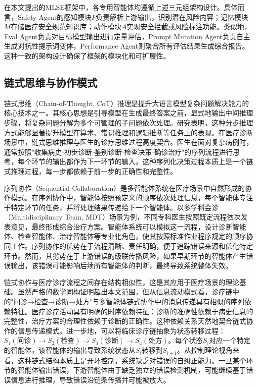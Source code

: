 在本文提出的MLSE框架中，各专用智能体均遵循上述三元组架构设计。具体而言，Safety Agent的感知模块$P$负责解析上游输出，识别潜在风险内容；记忆模块$M$存储医疗安全规范知识库；动作模块$A$实现安全拦截或风险标注功能。类似地，Eval Agent负责对目标模型输出进行定量评估，Prompt Mutation Agent负责自主生成对抗性提示词变体，Performance Agent则聚合所有评估结果生成综合报告。这种一致的架构设计确保了框架的模块化和可扩展性。

\subsection{链式思维与协作模式}
\label{subsec:chain_of_thought}

链式思维（Chain-of-Thought, CoT）推理是提升大语言模型复杂问题解决能力的核心技术之一。其核心思想是引导模型在生成最终答案之前，显式地输出中间推理步骤，将复杂问题分解为多个可管理的子问题依次处理。研究表明\cite{wei2022chain}，这种分步推理方式能够显著提升模型在算术、常识推理和逻辑推断等任务上的表现。在医疗诊断场景中，链式思维推理与医生的诊疗思维过程高度契合。医生在面对复杂病例时，通常按照"收集病史-初步诊断-鉴别诊断-检查决策-确诊治疗"的序列流程进行思考，每个环节的输出都作为下一环节的输入。这种序列化决策过程本质上是一个链式推理过程，每一步都依赖于前一步的正确性和完整性。

序列协作（Sequential Collaboration）是多智能体系统在医疗场景中自然形成的协作模式。在序列协作中，智能体按照预定义的顺序依次处理信息，每个智能体专注于特定环节的任务，并将处理结果传递给下一个智能体。以多学科会诊（Multidisciplinary Team, MDT）场景为例，不同专科医生按照既定流程依次发表意见，最终形成综合治疗方案。智能体系统可以模拟这一流程，设计诊断智能体、检查智能体、治疗智能体等专业化角色，使其按照标准作业程序规定的顺序协同工作。序列协作的优势在于流程清晰、责任明确，便于追踪错误来源和优化特定环节。然而，其劣势在于上游错误的级联传播风险，如果早期环节的智能体产生错误输出，该错误可能影响后续所有智能体的判断，最终导致系统整体失效。

链式协作与医疗诊疗流程之间存在结构相似性，这是其应用于医疗场景的理论基础。虽然严格的数学同构证明超出本文范围，但从信息流动模式看，诊疗链中的"问诊→检查→诊断→处方"与多智能体链式协作中的消息传递具有相似的序列依赖特征。医疗诊疗活动具有明确的时序依赖特征：诊断的准确性依赖于病史信息的完整性，治疗方案的合理性依赖于诊断的正确性。这种依赖关系天然地契合链式协作的信息传递模式。进一步地，可以将临床诊疗链抽象为状态转移过程：$S_1(\text{问诊}) \to S_2(\text{检查}) \to S_3(\text{诊断}) \to S_4(\text{处方})$。每个状态$S_i$对应一个特定的智能体，该智能体的输出导致系统状态从$S_i$转移到$S_{i+1}$。从控制理论视角来看，这种链式结构本质上是开环控制，系统缺乏对错误的自纠正能力。一旦某个环节的智能体输出错误，下游智能体由于缺乏独立的错误检测机制，可能继续基于错误信息进行推理，导致错误沿链条传播并可能被放大。

